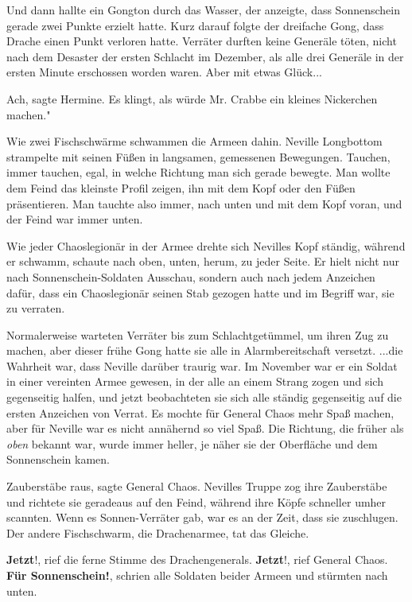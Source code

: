 Und dann hallte ein Gongton durch das Wasser, der anzeigte, dass Sonnenschein
gerade zwei Punkte erzielt hatte. Kurz darauf folgte der dreifache Gong, dass
Drache einen Punkt verloren hatte. Verräter durften keine Generäle töten, nicht
nach dem Desaster der ersten Schlacht im Dezember, als alle drei Generäle in der
ersten Minute erschossen worden waren. Aber mit etwas Glück...

\glqq Ach\grqq{}, sagte Hermine. \glqq Es klingt, als würde Mr. Crabbe ein
kleines Nickerchen machen."

Wie zwei Fischschwärme schwammen die Armeen dahin. Neville Longbottom strampelte
mit seinen Füßen in langsamen, gemessenen Bewegungen. Tauchen, immer tauchen,
egal, in welche Richtung man sich gerade bewegte. Man wollte dem Feind das
kleinste Profil zeigen, ihn mit dem Kopf oder den Füßen präsentieren. Man
tauchte also immer, nach unten und mit dem Kopf voran, und der Feind war immer
unten.

Wie jeder Chaoslegionär in der Armee drehte sich Nevilles Kopf ständig, während
er schwamm, schaute nach oben, unten, herum, zu jeder Seite. Er hielt nicht nur
nach Sonnenschein-Soldaten Ausschau, sondern auch nach jedem Anzeichen dafür,
dass ein Chaoslegionär seinen Stab gezogen hatte und im Begriff war, sie zu
verraten.

Normalerweise warteten Verräter bis zum Schlachtgetümmel, um ihren Zug zu
machen, aber dieser frühe Gong hatte sie alle in Alarmbereitschaft versetzt.
...die Wahrheit war, dass Neville darüber traurig war. Im November war er ein
Soldat in einer vereinten Armee gewesen, in der alle an einem Strang zogen und
sich gegenseitig halfen, und jetzt beobachteten sie sich alle ständig
gegenseitig auf die ersten Anzeichen von Verrat. Es mochte für General Chaos
mehr Spaß machen, aber für Neville war es nicht annähernd so viel Spaß. Die
Richtung, die früher als \emph{\glqq oben\grqq{}} bekannt war, wurde immer
heller, je näher sie der Oberfläche und dem Sonnenschein kamen.

\glqq Zauberstäbe raus\grqq{}, sagte General Chaos. Nevilles Truppe zog ihre
Zauberstäbe und richtete sie geradeaus auf den Feind, während ihre Köpfe
schneller umher scannten. Wenn es Sonnen-Verräter gab, war es an der Zeit, dass
sie zuschlugen. Der andere Fischschwarm, die Drachenarmee, tat das Gleiche.

\glqq \textbf{Jetzt}!\grqq{}, rief die ferne Stimme des Drachengenerals. \glqq
\textbf{Jetzt}!\grqq{}, rief General Chaos. \glqq \textbf{Für
Sonnenschein!}\grqq{}, schrien alle Soldaten beider Armeen und stürmten nach
unten.

